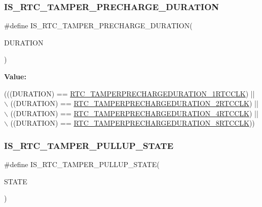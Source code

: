 \subsubsection{\texorpdfstring{I\+S\+\_\+\+R\+T\+C\+\_\+\+T\+A\+M\+P\+E\+R\+\_\+\+P\+R\+E\+C\+H\+A\+R\+G\+E\+\_\+\+D\+U\+R\+A\+T\+I\+ON}{IS\_RTC\_TAMPER\_PRECHARGE\_DURATION}}
{\footnotesize\ttfamily \#define I\+S\+\_\+\+R\+T\+C\+\_\+\+T\+A\+M\+P\+E\+R\+\_\+\+P\+R\+E\+C\+H\+A\+R\+G\+E\+\_\+\+D\+U\+R\+A\+T\+I\+ON(\begin{DoxyParamCaption}\item[{}]{D\+U\+R\+A\+T\+I\+ON }\end{DoxyParamCaption})}

{\bfseries Value\+:}
\begin{DoxyCode}
(((DURATION) == \hyperlink{group___r_t_c_ex___tamper___pin___precharge___duration___definitions_gac2a79623b1690b2e5893e6b53dad3480}{RTC\_TAMPERPRECHARGEDURATION\_1RTCCLK}) || \(\backslash\)
                                                    ((DURATION) == 
      \hyperlink{group___r_t_c_ex___tamper___pin___precharge___duration___definitions_ga270be6ced6bafda4a94e5624a0bc3eab}{RTC\_TAMPERPRECHARGEDURATION\_2RTCCLK}) || \(\backslash\)
                                                    ((DURATION) == 
      \hyperlink{group___r_t_c_ex___tamper___pin___precharge___duration___definitions_ga12497acabf044c2d1de7d735efdb2efc}{RTC\_TAMPERPRECHARGEDURATION\_4RTCCLK}) || \(\backslash\)
                                                    ((DURATION) == 
      \hyperlink{group___r_t_c_ex___tamper___pin___precharge___duration___definitions_ga353fca64c5b0e927ab024ed13a526e09}{RTC\_TAMPERPRECHARGEDURATION\_8RTCCLK}))
\end{DoxyCode}
\mbox{\label{group___r_t_c_ex___i_s___r_t_c___definitions_gaad007ed47ef7ae636945088c93e42f5d}} 
\subsubsection{\texorpdfstring{I\+S\+\_\+\+R\+T\+C\+\_\+\+T\+A\+M\+P\+E\+R\+\_\+\+P\+U\+L\+L\+U\+P\+\_\+\+S\+T\+A\+TE}{IS\_RTC\_TAMPER\_PULLUP\_STATE}}
{\footnotesize\ttfamily \#define I\+S\+\_\+\+R\+T\+C\+\_\+\+T\+A\+M\+P\+E\+R\+\_\+\+P\+U\+L\+L\+U\+P\+\_\+\+S\+T\+A\+TE(\begin{DoxyParamCaption}\item[{}]{S\+T\+A\+TE }\end{DoxyParamCaption})}

